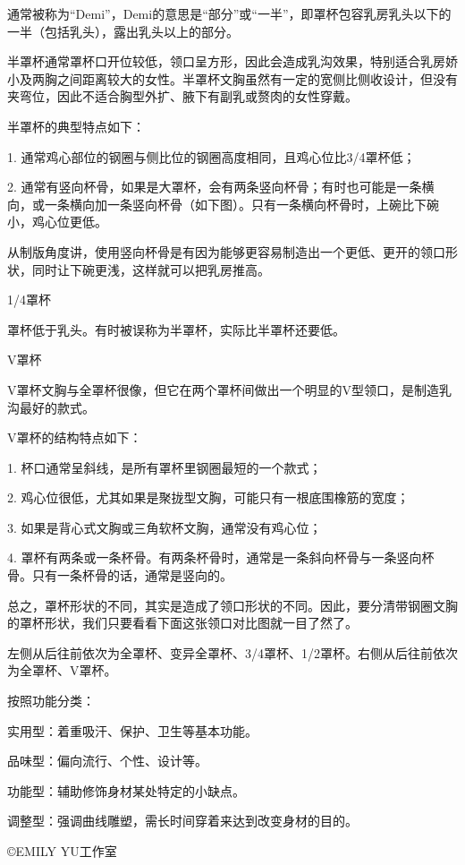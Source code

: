 \documentclass[12pt,UTF8]{ctexbook}
\begin{document}
通常被称为“Demi”，Demi的意思是“部分”或“一半”，即罩杯包容乳房乳头以下的一半（包括乳头），露出乳头以上的部分。

半罩杯通常罩杯口开位较低，领口呈方形，因此会造成乳沟效果，特别适合乳房娇小及两胸之间距离较大的女性。半罩杯文胸虽然有一定的宽侧比侧收设计，但没有夹弯位，因此不适合胸型外扩、腋下有副乳或赘肉的女性穿戴。


半罩杯的典型特点如下：

1. 通常鸡心部位的钢圈与侧比位的钢圈高度相同，且鸡心位比3/4罩杯低；

2. 通常有竖向杯骨，如果是大罩杯，会有两条竖向杯骨；有时也可能是一条横向，或一条横向加一条竖向杯骨（如下图）。只有一条横向杯骨时，上碗比下碗小，鸡心位更低。

从制版角度讲，使用竖向杯骨是有因为能够更容易制造出一个更低、更开的领口形状，同时让下碗更浅，这样就可以把乳房推高。



1/4罩杯

罩杯低于乳头。有时被误称为半罩杯，实际比半罩杯还要低。



V罩杯

V罩杯文胸与全罩杯很像，但它在两个罩杯间做出一个明显的V型领口，是制造乳沟最好的款式。


V罩杯的结构特点如下：

1. 杯口通常呈斜线，是所有罩杯里钢圈最短的一个款式；

2. 鸡心位很低，尤其如果是聚拢型文胸，可能只有一根底围橡筋的宽度；

3. 如果是背心式文胸或三角软杯文胸，通常没有鸡心位；

4. 罩杯有两条或一条杯骨。有两条杯骨时，通常是一条斜向杯骨与一条竖向杯骨。只有一条杯骨的话，通常是竖向的。



总之，罩杯形状的不同，其实是造成了领口形状的不同。因此，要分清带钢圈文胸的罩杯形状，我们只要看看下面这张领口对比图就一目了然了。

左侧从后往前依次为全罩杯、变异全罩杯、3/4罩杯、1/2罩杯。右侧从后往前依次为全罩杯、V罩杯。



按照功能分类：

实用型：着重吸汗、保护、卫生等基本功能。

品味型：偏向流行、个性、设计等。

功能型：辅助修饰身材某处特定的小缺点。

调整型：强调曲线雕塑，需长时间穿着来达到改变身材的目的。

©EMILY YU工作室
\end{document}
